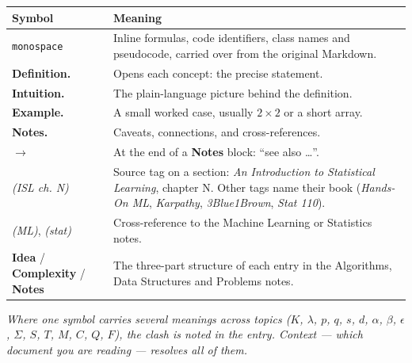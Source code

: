 \documentclass[10pt,letterpaper,onecolumn]{article}
\makeatletter
\newenvironment{symtab}
  {\begin{longtable}{@{}>{\raggedright\arraybackslash}p{0.26\textwidth}%
                       >{\raggedright\arraybackslash}p{0.70\textwidth}@{}}
   \toprule
   \textbf{Symbol} & \textbf{Meaning} \\
   \midrule
   \endhead
   \bottomrule
   \endfoot}
  {\end{longtable}}
\makeatother
\begin{document}
\begin{symtab}
\texttt{monospace} & Inline formulas, code identifiers, class names and pseudocode, carried over from the original Markdown. \\
\textbf{Definition.} & Opens each concept: the precise statement. \\
\textbf{Intuition.} & The plain-language picture behind the definition. \\
\textbf{Example.} & A small worked case, usually $2\times2$ or a short array. \\
\textbf{Notes.} & Caveats, connections, and cross-references. \\
$\to$ & At the end of a \textbf{Notes} block: ``see also \dots''. \\
\emph{(ISL ch. N)} & Source tag on a section: \emph{An Introduction to Statistical Learning}, chapter N. Other tags name their book (\emph{Hands-On ML}, \emph{Karpathy}, \emph{3Blue1Brown}, \emph{Stat 110}). \\
\emph{(ML)}, \emph{(stat)} & Cross-reference to the Machine Learning or Statistics notes. \\
\textbf{Idea} / \textbf{Complexity} / \textbf{Notes} & The three-part structure of each entry in the Algorithms, Data Structures and Problems notes. \\
\end{symtab}

\vfill
{\footnotesize\itshape
Where one symbol carries several meanings across topics ($K$, $\lambda$, $p$, $q$, $s$, $d$,
$\alpha$, $\beta$, $\epsilon$, $\Sigma$, $S$, $T$, $M$, $C$, $Q$, $F$), the clash is noted in the
entry. Context — which document you are reading — resolves all of them.\par}
\end{document}
